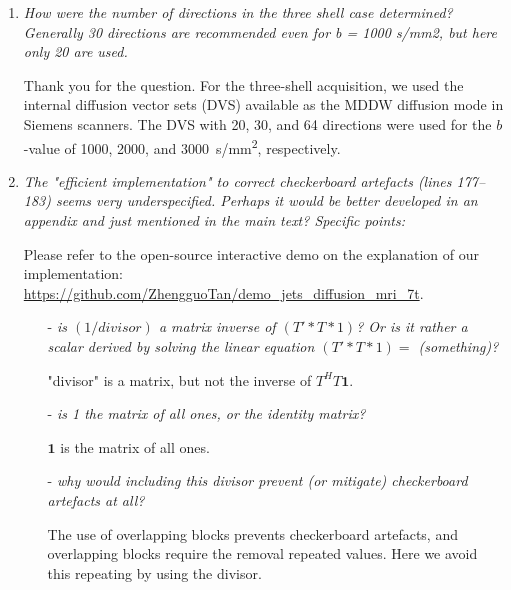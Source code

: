 \documentclass[a4paper,11pt,twoside]{report}
\begin{document}
\begin{enumerate}
    \item \textit{How were the number of directions in the three shell case determined? Generally 30 directions are recommended even for b = 1000 s/mm2, but here only 20 are used.}

    \hspace{1em} Thank you for the question.
    For the three-shell acquisition, we used the internal diffusion vector sets (DVS)
    available as the MDDW diffusion mode in Siemens scanners.
    The DVS with 20, 30, and 64 directions were used
    for the $b$-value of \num{1000}, \num{2000}, and \SI{3000}{s/mm^2},
    respectively.

    \item \textit{The "efficient implementation" to correct checkerboard artefacts (lines 177--183) seems very underspecified. Perhaps it would be better developed in an appendix and just mentioned in the main text? Specific points:}

    \hspace{1em} Please refer to the open-source interactive demo
    on the explanation of our implementation:
    \url{https://github.com/ZhengguoTan/demo_jets_diffusion_mri_7t}.

        \begin{itemize}
            \item [-] \textit{is $(1/divisor)$ a matrix inverse of $(T'*T*1)$? Or is it rather a scalar derived by solving the linear equation $(T'*T*1) =$ (something)?}

            \hspace{0.5em} "divisor" is a matrix, but not the inverse of $T^H T \mathbf{1}$.

            \item [-] \textit{is 1 the matrix of all ones, or the identity matrix?}

            \hspace{0.5em} $\mathbf{1}$ is the matrix of all ones.

            \item [-] \textit{why would including this divisor prevent (or mitigate) checkerboard artefacts at all?}

            \hspace{0.5em} The use of overlapping blocks prevents checkerboard artefacts, and overlapping blocks require the removal repeated values.
            Here we avoid this repeating by using the divisor.

        \end{itemize}
\end{enumerate}
\end{document}
